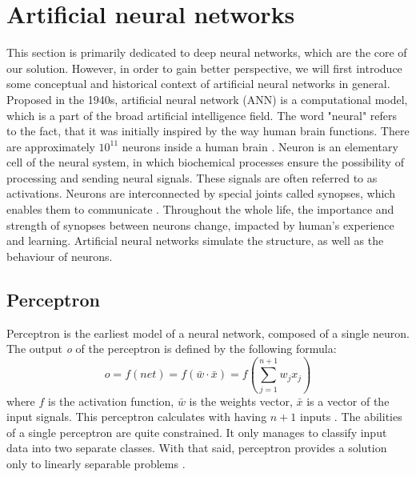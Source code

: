 \section{Artificial neural networks}
This section is primarily dedicated to deep neural networks, which are the core of our solution. However, in order to gain better perspective, we will first introduce some conceptual and historical context of artificial neural networks in general.\\
Proposed in the 1940s, artificial neural network (ANN) is a computational model, which is a part of the broad artificial intelligence field. The word "neural" refers to the fact, that it was initially inspired by the way human brain functions. There are approximately $10^{11}$ neurons inside a human brain \cite{navrat2007umela}. Neuron is an elementary cell of the neural system, in which biochemical processes ensure the possibility of processing and sending neural signals. These signals are often referred to as activations. Neurons are interconnected by special joints called synopses, which enables them to communicate \cite{navrat2007umela}. Throughout the whole life, the importance and strength of synopses between neurons change, impacted by human's experience and learning. Artificial neural networks simulate the structure, as well as the behaviour of neurons. 

\subsection*{Perceptron}
Perceptron is the earliest model of a neural network, composed of a single neuron. The output \textit{o} of the perceptron is defined by the following formula:
\begin{equation}
    o = f(net) = f(\bar w \cdot \bar x) = f (\sum_{j=1}^{n+1} w_jx_j)
\end{equation}
where $f$ is the activation function, $\bar w$ is the weights vector, $\bar x$ is a vector of the input signals. This perceptron calculates with having $n+1$ inputs \cite{navrat2007umela}. The abilities of a single perceptron are quite constrained. It only manages to classify input data into two separate classes. With that said, perceptron provides a solution only to linearly separable problems \cite{navrat2007umela}.
